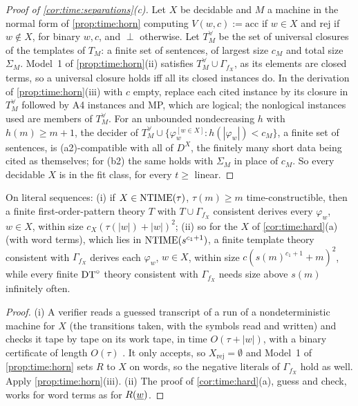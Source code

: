 \begin{proof}[Proof of \cref{cor:time:separations}(c)]
Let $X$ be decidable and $M$ a machine in the normal form of \cref{prop:time:horn} computing $V(w,c):=\mathrm{acc}$ if $w\in X$ and $\mathrm{rej}$ if $w\notin X$, for binary $w,c$, and $\perp$ otherwise. Let $T^\forall_M$ be the set of universal closures of the templates of $T_M$: a finite set of sentences, of largest size $c_M$ and total size $\Sigma_M$. Model~1 of \cref{prop:time:horn}(ii) satisfies $T^\forall_M\cup\Gamma_{f_X}$, as its elements are closed terms, so a universal closure holds iff all its closed instances do. In the derivation of \cref{prop:time:horn}(iii) with $c$ empty, replace each cited instance by its closure in $T^\forall_M$ followed by A4 instances and MP, which are logical; the nonlogical instances used are members of $T^\forall_M$. For an unbounded nondecreasing $h$ with $h(m)\ge m+1$, the decider of $T^\forall_M\cup\{\varphi_w^{[w\in X]}:h(|\varphi_w|)<c_M\}$, a finite set of sentences, is (a2)-compatible with all of $D^X$, the finitely many short data being cited as themselves; for (b2) the same holds with $\Sigma_M$ in place of $c_M$. So every decidable $X$ is in the fit class, for every $t\ge$ linear.
\end{proof}

\begin{corollary}\label{cor:time:tight}
On literal sequences: (i) if $X\in\mathrm{NTIME}(\tau)$, $\tau(m)\ge m$ time-constructible, then a finite first-order-pattern theory $T$ with $T\cup\Gamma_{f_X}$ consistent derives every $\varphi_w$, $w\in X$, within size $c_X(\tau(|w|)+|w|)^2$; (ii) so for the $X$ of \cref{cor:time:hard}(a) (with word terms), which lies in $\mathrm{NTIME}(s^{c_1+1})$, a finite template theory consistent with $\Gamma_{f_X}$ derives each $\varphi_w$, $w\in X$, within size $c(s(m)^{c_1+1}+m)^2$, while every finite $\mathrm{DT}^{\circ}$ theory consistent with $\Gamma_{f_X}$ needs size above $s(m)$ infinitely often.
\end{corollary}

\begin{proof}
(i) A verifier reads a guessed transcript of a run of a nondeterministic machine for $X$ (the transitions taken, with the symbols read and written) and checks it tape by tape on its work tape, in time $O(\tau+|w|)$, with a binary certificate of length $O(\tau)$ \citep{book1970time}. It only accepts, so $X_{\mathrm{rej}}=\emptyset$ and Model~1 of \cref{prop:time:horn} sets $R$ to $X$ on words, so the negative literals of $\Gamma_{f_X}$ hold as well. Apply \cref{prop:time:horn}(iii). (ii) The proof of \cref{cor:time:hard}(a), guess and check, works for word terms as for $R(\underline{w})$.
\end{proof}


